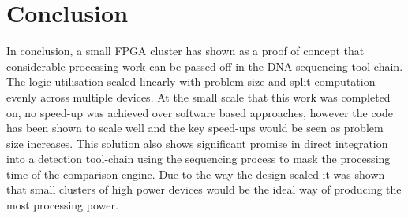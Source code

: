 \documentclass[conference]{IEEEtran}
\begin{document}
%



%


\section{Conclusion}
In conclusion, a small FPGA cluster has shown as a proof of concept that considerable processing work can be passed off in the DNA sequencing tool-chain. The logic utilisation scaled linearly with problem size and split computation evenly across multiple devices. At the small scale that this work was completed on, no speed-up was achieved over software based approaches, however the code has been shown to scale well and the key speed-ups would be seen as problem size increases. This solution also shows significant promise in direct integration into a detection tool-chain using the sequencing process to mask the processing time of the comparison engine. Due to the way the design scaled it was shown that small clusters of high power devices would be the ideal way of producing the most processing power.
\end{document}
